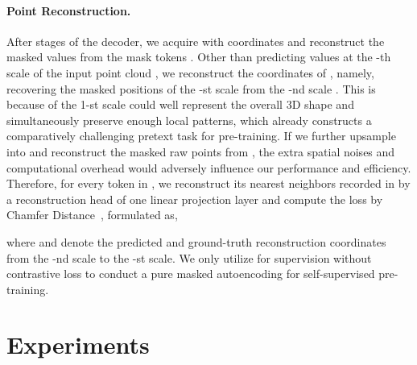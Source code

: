 \documentclass{article}
\begin{document}
\paragraph{Point Reconstruction.}
After  stages of the decoder, we acquire  with coordinates  and reconstruct the masked values from the mask tokens . Other than predicting values at the -th scale of the input point cloud , we reconstruct the coordinates of , namely, recovering the masked positions of the -st scale  from the -nd scale . This is because  of the 1-st scale could well represent the overall 3D shape and simultaneously preserve enough local patterns, which already constructs a comparatively challenging pretext task for pre-training. If we further upsample  into  and reconstruct the masked raw points from , the extra spatial noises and computational overhead would adversely influence our performance and efficiency. Therefore, for every token in , we reconstruct its  nearest neighbors recorded in  by a reconstruction head of one linear projection layer and compute the loss by  Chamfer Distance~\cite{chamfer},
formulated as,

where  and  denote the predicted and ground-truth reconstruction coordinates from the -nd scale to the -st scale. We only utilize  for supervision without contrastive loss to conduct a pure masked autoencoding for self-supervised pre-training.

\section{Experiments}
\end{document}
